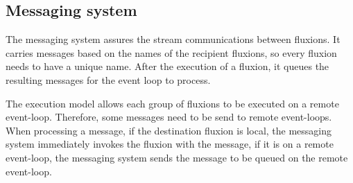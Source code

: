 \subsection{Messaging system}


The messaging system assures the stream communications between fluxions.
It carries messages based on the names of the recipient fluxions, so every fluxion needs to have a unique name.
After the execution of a fluxion, it queues the resulting messages for the event loop to process.

The execution model allows each group of fluxions to be executed on a remote event-loop.
Therefore, some messages need to be send to remote event-loops.
When processing a message, if the destination fluxion is local, the messaging system immediately invokes the fluxion with the message, if it is on a remote event-loop, the messaging system sends the message to be queued on the remote event-loop.






